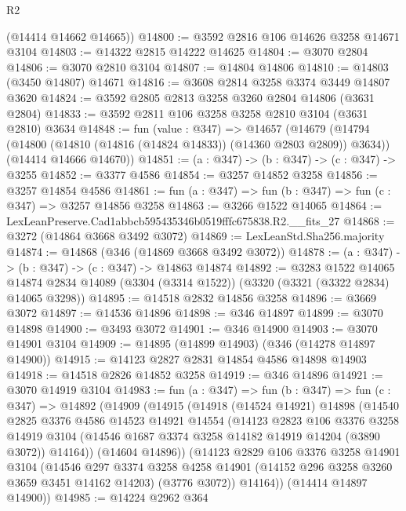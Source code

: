 \begin{lexlean}{R2}
\begin{coremodule}
      (@14414 @14662 @14665))
@14800 := @3592 @2816 @106 @14626 @3258 @14671 @3104
@14803 := @14322 @2815 @14222 @14625
@14804 := @3070 @2804
@14806 := @3070 @2810 @3104
@14807 := @14804 @14806
@14810 := @14803 (@3450 @14807) @14671
@14816 := @3608 @2814 @3258 @3374 @3449 @14807 @3620
@14824 := @3592 @2805 @2813 @3258 @3260 @2804 @14806 (@3631 @2804)
@14833 := @3592 @2811 @106 @3258 @3258 @2810 @3104 (@3631 @2810) @3634
@14848 := fun (value : @347) =>
  @14657
    (@14679
      (@14794 (@14800 (@14810 (@14816 (@14824 @14833)) (@14360 @2803 @2809)) @3634))
      (@14414 @14666 @14670))
@14851 := (a : @347) -> (b : @347) -> (c : @347) -> @3255
@14852 := @3377 @4586
@14854 := @3257 @14852 @3258
@14856 := @3257 @14854 @4586
@14861 := fun (a : @347) => fun (b : @347) => fun (c : @347) => @3257 @14856 @3258
@14863 := @3266 @1522 @14065
@14864 := LexLeanPreserve.Cad1abbcb595435346b0519fffc675838.R2.__fits_27
@14868 := @3272 (@14864 @3668 @3492 @3072)
@14869 := LexLeanStd.Sha256.majority
@14874 := @14868 (@346 (@14869 @3668 @3492 @3072))
@14878 := (a : @347) -> (b : @347) -> (c : @347) -> @14863 @14874
@14892 := @3283
    @1522
    @14065
    @14874
    @2834
    @14089
    (@3304 (@3314 @1522))
    (@3320 (@3321 (@3322 @2834) @14065 @3298))
@14895 := @14518 @2832 @14856 @3258
@14896 := @3669 @3072
@14897 := @14536 @14896
@14898 := @346 @14897
@14899 := @3070 @14898
@14900 := @3493 @3072
@14901 := @346 @14900
@14903 := @3070 @14901 @3104
@14909 := @14895 (@14899 @14903) (@346 (@14278 @14897 @14900))
@14915 := @14123 @2827 @2831 @14854 @4586 @14898 @14903
@14918 := @14518 @2826 @14852 @3258
@14919 := @346 @14896
@14921 := @3070 @14919 @3104
@14983 := fun (a : @347) =>
  fun (b : @347) =>
  fun (c : @347) =>
  @14892
    (@14909
      (@14915
        (@14918
          (@14524 @14921)
          @14898
          (@14540
            @2825
            @3376
            @4586
            @14523
            @14921
            @14554
            (@14123
              @2823
              @106
              @3376
              @3258
              @14919
              @3104
              (@14546 @1687 @3374 @3258 @14182 @14919 @14204 (@3890 @3072))
              @14164))
          (@14604 @14896))
        (@14123
          @2829
          @106
          @3376
          @3258
          @14901
          @3104
          (@14546
            @297
            @3374
            @3258
            @4258
            @14901
            (@14152 @296 @3258 @3260 @3659 @3451 @14162 @14203)
            (@3776 @3072))
          @14164))
      (@14414 @14897 @14900))
@14985 := @14224 @2962 @364

\end{coremodule}
\end{lexlean}
